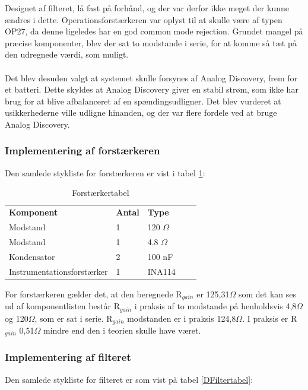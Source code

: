 Designet af filteret, lå fast på forhånd, og der var derfor ikke meget der kunne ændres i dette. Operationsforstærkeren var oplyst til at skulle være af typen OP27, da denne ligeledes har en god common mode rejection. Grundet mangel på præcise komponenter, blev der sat to modstande i serie, for at komme så tæt på den udregnede værdi, som muligt. \\
\\
Det blev desuden valgt at systemet skulle forsynes af Analog Discovery, frem for et batteri. Dette skyldes at Analog Discovery giver en stabil strøm, som ikke har brug for at blive afbalanceret af en spændingsudligner. Det blev vurderet at usikkerhederne ville udligne hinanden, og der var flere fordele ved at bruge Analog Discovery.\\


\subsubsection{Implementering af forstærkeren}
Den samlede stykliste for forstærkeren er vist i tabel \ref{DForsttabel}:

\begin{table}[H]
\centering
\begin{tabular}{|l|l|l|ll}
\cline{1-3}
\textbf{Komponent} & \textbf{Antal} & \textbf{Type}  &  &  \\ \cline{1-3}
Modstand           & 1              & 120 $\Omega$   &  &  \\ \cline{1-3}
Modstand           & 1              & 4.8 $\Omega$   &  &  \\ \cline{1-3}
Kondensator        & 2              & 100 nF         &  &  \\ \cline{1-3}
Instrumentationsforstærker &    1   & INA114		     &  &  \\ \cline{1-3}
\end{tabular}
\caption{Forstærkertabel}
\label{DForsttabel}
\end{table}

For forstærkeren gælder det, at den beregnede R$_{gain}$ er 125,31$\Omega$ som det kan ses ud af komponentlisten består R$_{gain}$ i praksis af to modstande på henholdsvis 4,8$\Omega$ og 120$\Omega$, som er sat i serie. R$_{gain}$ modstanden er i praksis 124,8$\Omega$. I praksis er R$_{gain}$ 0,51$\Omega$ mindre end den i teorien skulle have været.

\subsubsection{Implementering af filteret}
Den samlede stykliste for filteret er som vist på tabel \ref{DFiltertabel}:

